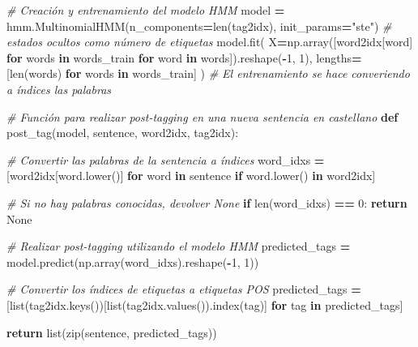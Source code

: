 \documentclass[
  a4paper,
  DIV=11,
  numbers=noendperiod]{scrreprt}
\newenvironment{Shaded}{\begin{snugshade}}{\end{snugshade}}
\newcommand{\BuiltInTok}[1]{#1}
\newcommand{\CommentTok}[1]{\textcolor[rgb]{0.56,0.35,0.01}{\textit{#1}}}
\newcommand{\ControlFlowTok}[1]{\textcolor[rgb]{0.13,0.29,0.53}{\textbf{#1}}}
\newcommand{\DecValTok}[1]{\textcolor[rgb]{0.00,0.00,0.81}{#1}}
\newcommand{\KeywordTok}[1]{\textcolor[rgb]{0.13,0.29,0.53}{\textbf{#1}}}
\newcommand{\NormalTok}[1]{#1}
\newcommand{\OperatorTok}[1]{\textcolor[rgb]{0.81,0.36,0.00}{\textbf{#1}}}
\newcommand{\StringTok}[1]{\textcolor[rgb]{0.31,0.60,0.02}{#1}}
\newcommand{\VariableTok}[1]{\textcolor[rgb]{0.00,0.00,0.00}{#1}}
\begin{document}
\begin{Shaded}
\begin{Highlighting}[numbers=left,,]
\CommentTok{\# Creación y entrenamiento del modelo HMM}
\NormalTok{model }\OperatorTok{=}\NormalTok{ hmm.MultinomialHMM(n\_components}\OperatorTok{=}\BuiltInTok{len}\NormalTok{(tag2idx), init\_params}\OperatorTok{=}\StringTok{"ste"}\NormalTok{) }\CommentTok{\# estados ocultos como número de etiquetas}
\NormalTok{model.fit(}
\NormalTok{    X}\OperatorTok{=}\NormalTok{np.array([word2idx[word] }\ControlFlowTok{for}\NormalTok{ words }\KeywordTok{in}\NormalTok{ words\_train }\ControlFlowTok{for}\NormalTok{ word }\KeywordTok{in}\NormalTok{ words]).reshape(}\OperatorTok{{-}}\DecValTok{1}\NormalTok{, }\DecValTok{1}\NormalTok{),}
\NormalTok{    lengths}\OperatorTok{=}\NormalTok{[}\BuiltInTok{len}\NormalTok{(words) }\ControlFlowTok{for}\NormalTok{ words }\KeywordTok{in}\NormalTok{ words\_train]}
\NormalTok{) }\CommentTok{\# El entrenamiento se hace converiendo a índices las palabras}
\end{Highlighting}
\end{Shaded}

\begin{Shaded}
\begin{Highlighting}[numbers=left,,]
\CommentTok{\# Función para realizar post{-}tagging en una nueva sentencia en castellano}
\KeywordTok{def}\NormalTok{ post\_tag(model, sentence, word2idx, tag2idx):}
    
    \CommentTok{\# Convertir las palabras de la sentencia a índices}
\NormalTok{    word\_idxs }\OperatorTok{=}\NormalTok{ [word2idx[word.lower()] }\ControlFlowTok{for}\NormalTok{ word }\KeywordTok{in}\NormalTok{ sentence }\ControlFlowTok{if}\NormalTok{ word.lower() }\KeywordTok{in}\NormalTok{ word2idx]}
    
    \CommentTok{\# Si no hay palabras conocidas, devolver None}
    \ControlFlowTok{if} \BuiltInTok{len}\NormalTok{(word\_idxs) }\OperatorTok{==} \DecValTok{0}\NormalTok{:}
        \ControlFlowTok{return} \VariableTok{None}
    
    \CommentTok{\# Realizar post{-}tagging utilizando el modelo HMM}
\NormalTok{    predicted\_tags }\OperatorTok{=}\NormalTok{ model.predict(np.array(word\_idxs).reshape(}\OperatorTok{{-}}\DecValTok{1}\NormalTok{, }\DecValTok{1}\NormalTok{))}
    
    \CommentTok{\# Convertir los índices de etiquetas a etiquetas POS}
\NormalTok{    predicted\_tags }\OperatorTok{=}\NormalTok{ [}\BuiltInTok{list}\NormalTok{(tag2idx.keys())[}\BuiltInTok{list}\NormalTok{(tag2idx.values()).index(tag)] }\ControlFlowTok{for}\NormalTok{ tag }\KeywordTok{in}\NormalTok{ predicted\_tags]}
    
    \ControlFlowTok{return} \BuiltInTok{list}\NormalTok{(}\BuiltInTok{zip}\NormalTok{(sentence, predicted\_tags))}
\end{Highlighting}
\end{Shaded}
\end{document}
